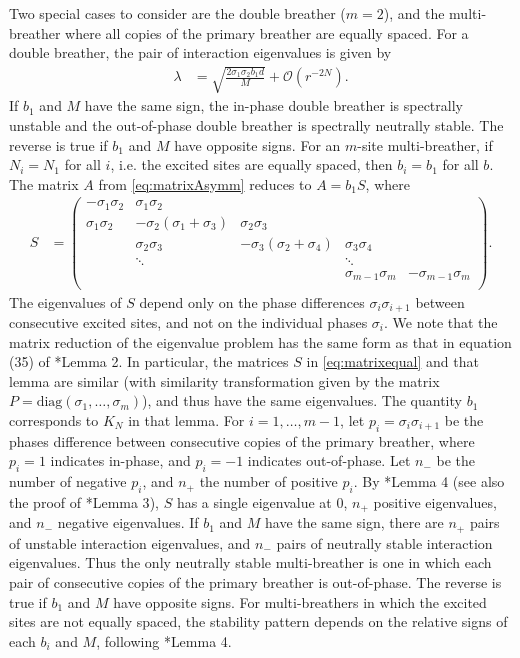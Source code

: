 \documentclass[12pt,reqno]{amsart}
\theoremstyle{definition}
\begin{document}
Two special cases to consider are the double breather ($m=2$), and the multi-breather where all copies of the primary breather are equally spaced. For a double breather, the pair of interaction eigenvalues is given by
\begin{align}\label{eq:inteigsdouble}
\lambda &= \sqrt{\frac{2 \sigma_1 \sigma_2 b_1 d}{M}} + \mathcal{O}(r^{-2N}).
\end{align}
If $b_1$ and $M$ have the same sign, the in-phase double breather is spectrally unstable and the out-of-phase double breather is spectrally neutrally stable. The reverse is true if $b_1$ and $M$ have opposite signs. For an $m$-site multi-breather, if $N_i = N_1$ for all $i$, i.e. the excited sites are equally spaced, then $b_i = b_1$ for all $b$. The matrix $A$ from \cref{eq:matrixAsymm} reduces to $A = b_1 S$, where 
\begin{align}\label{eq:matrixequal}
S &= \begin{pmatrix}
-\sigma_1 \sigma_2 & \sigma_1 \sigma_2 & & & \\
\sigma_1 \sigma_2 & -\sigma_2(\sigma_1+\sigma_3) & \sigma_2 \sigma_3 \\
& \sigma_2 \sigma_3 & -\sigma_3(\sigma_2+\sigma_4) & \sigma_3 \sigma_4 \\
& \ddots & & \ddots \\
& & & \sigma_{m-1}\sigma_m & -\sigma_{m-1}\sigma_m  \\
\end{pmatrix}.
\end{align}
The eigenvalues of $S$ depend only on the phase differences $\sigma_i \sigma_{i+1}$ between consecutive excited sites, and not on the individual phases $\sigma_i$. We note that the matrix reduction of the eigenvalue problem has the same form as that in equation (35) of \cite{Pelinovsky2012}*{Lemma 2}. In particular, the matrices $S$ in \cref{eq:matrixequal} and that lemma are similar (with similarity transformation given by the matrix $P = \text{diag}(\sigma_1, \dots, \sigma_m)$), and thus have the same eigenvalues. The quantity $b_1$ corresponds to $K_N$ in that lemma. For $i = 1, \dots, m-1$, let $p_i = \sigma_i\sigma_{i+1}$ be the phases difference between consecutive copies of the primary breather, where $p_i = 1$ indicates in-phase, and $p_i = -1$ indicates out-of-phase. Let $n_-$ be the number of negative $p_i$, and $n_+$ the number of positive $p_i$. By \cite{Sandstede1998}*{Lemma 4} (see also the proof of \cite{Pelinovsky2012}*{Lemma 3}), $S$ has a single eigenvalue at 0, $n_+$ positive eigenvalues, and $n_-$ negative eigenvalues. If $b_1$ and $M$ have the same sign, there are $n_+$ pairs of unstable interaction eigenvalues, and $n_-$ pairs of neutrally stable interaction eigenvalues. Thus the only neutrally stable multi-breather is one in which each pair of consecutive copies of the primary breather is out-of-phase. The reverse is true if $b_1$ and $M$ have opposite signs. For multi-breathers in which the excited sites are not equally spaced, the stability pattern depends on the relative signs of each $b_i$ and $M$, following \cite{Sandstede1998}*{Lemma 4}.
\end{document}
